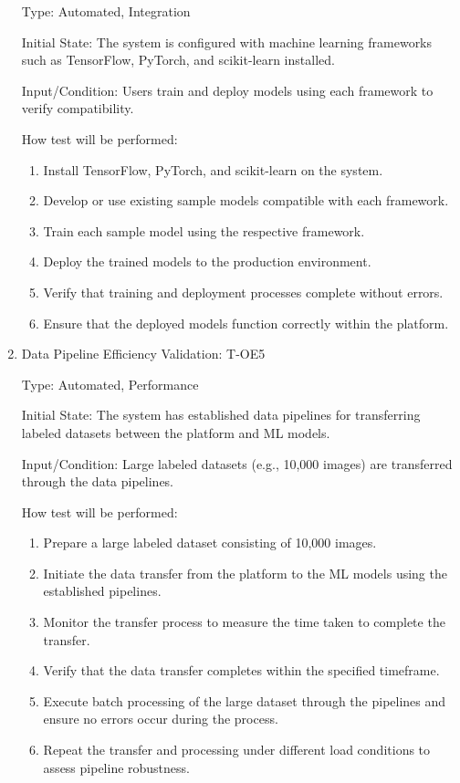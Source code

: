\documentclass[12pt, titlepage]{article}
\begin{document}
\begin{enumerate}
Type: Automated, Integration

Initial State: The system is configured with machine learning frameworks such as TensorFlow, PyTorch, and scikit-learn installed.

Input/Condition: Users train and deploy models using each framework to verify compatibility.

How test will be performed:
\begin{enumerate}
    \item Install TensorFlow, PyTorch, and scikit-learn on the system.
    \item Develop or use existing sample models compatible with each framework.
    \item Train each sample model using the respective framework.
    \item Deploy the trained models to the production environment.
    \item Verify that training and deployment processes complete without errors.
    \item Ensure that the deployed models function correctly within the platform.
\end{enumerate}

\item{Data Pipeline Efficiency Validation: T-OE5\\}

Type: Automated, Performance

Initial State: The system has established data pipelines for transferring labeled datasets between the platform and ML models.

Input/Condition: Large labeled datasets (e.g., 10,000 images) are transferred through the data pipelines.

How test will be performed:
\begin{enumerate}
    \item Prepare a large labeled dataset consisting of 10,000 images.
    \item Initiate the data transfer from the platform to the ML models using the established pipelines.
    \item Monitor the transfer process to measure the time taken to complete the transfer.
    \item Verify that the data transfer completes within the specified timeframe.
    \item Execute batch processing of the large dataset through the pipelines and ensure no errors occur during the process.
    \item Repeat the transfer and processing under different load conditions to assess pipeline robustness.
\end{enumerate}


\end{enumerate}
\end{document}
